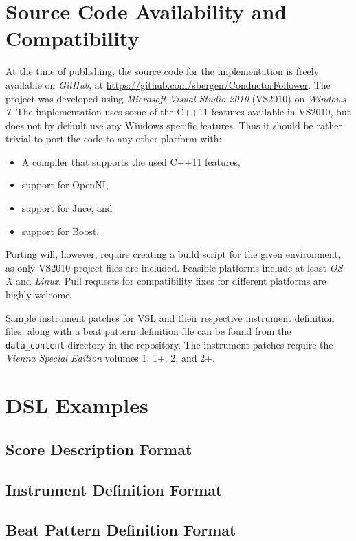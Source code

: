 \chapter{Source Code Availability and Compatibility}
\label{app:source_code_availability}

At the time of publishing,
the source code for the implementation is freely
available on \textit{GitHub},
at \url{https://github.com/sbergen/ConductorFollower}.
The project was developed using
\textit{Microsoft Visual Studio 2010} (VS2010)
on \textit{Windows 7}.
The implementation uses some of the C++11 features
available in VS2010, but does not by default use any
Windows specific features.
Thus it should be rather trivial to port
the code to any other platform with:
\begin{itemize}
\item A compiler that supports the used C++11 features,
\item support for OpenNI,
\item support for Juce, and
\item support for Boost.
\end{itemize}
Porting will, however,
require creating a build script for the given environment,
as only VS2010 project files are included.
Feasible platforms include at least
\textit{OS X} and \textit{Linux}.
Pull requests for compatibility fixes for different platforms
are highly welcome.

Sample instrument patches for VSL and their
respective instrument definition files,
along with a beat pattern definition file
can be found from the \texttt{data\_content}
directory in the repository.
The instrument patches require
the \textit{Vienna Special Edition}
volumes 1, 1+, 2, and 2+.

\chapter{DSL Examples}
\label{appendix:dsl_samples}

\section{Score Description Format}



\section{Instrument Definition Format}



\section{Beat Pattern Definition Format}


